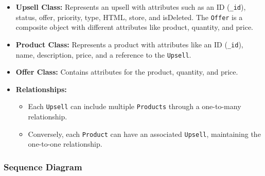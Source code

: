 \begin{itemize}
    \item \textbf{Upsell Class:} Represents an upsell with attributes such as an ID (\texttt{\_id}), status, offer, priority, type, HTML, store, and isDeleted. The \texttt{Offer} is a composite object with different attributes like product, quantity, and price.
    
    \item \textbf{Product Class:} Represents a product with attributes like an ID (\texttt{\_id}), name, description, price, and a reference to the \texttt{Upsell}.
    
    \item \textbf{Offer Class:} Contains attributes for the product, quantity, and price.
    
    \item \textbf{Relationships:}
    \begin{itemize}
        \item Each \texttt{Upsell} can include multiple \texttt{Products} through a one-to-many relationship.
        \item Conversely, each \texttt{Product} can have an associated \texttt{Upsell}, maintaining the one-to-one relationship.
    \end{itemize}
\end{itemize}

\subsubsection{Sequence Diagram}

